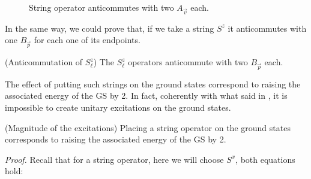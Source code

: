 \documentclass{Configuration_Files/PoliMi3i_thesis}
\begin{document}
\begin{figure}
\begin{center}
	\end{center}
	
	\caption{String operator anticommutes with two $A_{\vec{v}}$ each.}
	\label{fig:Av&string}
\end{figure}


In the same way, we could prove that, if we take a string $S^z$ it anticommutes with one $B_{\vec{p}} $ for each one of its endpoints.

\begin{proposition}(Anticommutation of $S^z_\ell$)
	The $S^z_\ell$ operators anticommute with two $B_{\vec{p}} $ each.
\end{proposition}

The effect of putting such strings on the ground states correspond to raising the associated energy of the GS by 2. In fact, coherently with what said in {\cite{Her20}}, it is impossible to create unitary excitations on the ground states.

\begin{proposition}(Magnitude of the excitations)
	Placing a string operator on the ground states corresponds to raising the associated energy of the GS by 2.
\end{proposition}

\textit{Proof.} \newline
Recall that for a string operator, here we will choose $S^x$, both equations hold:
\end{document}
